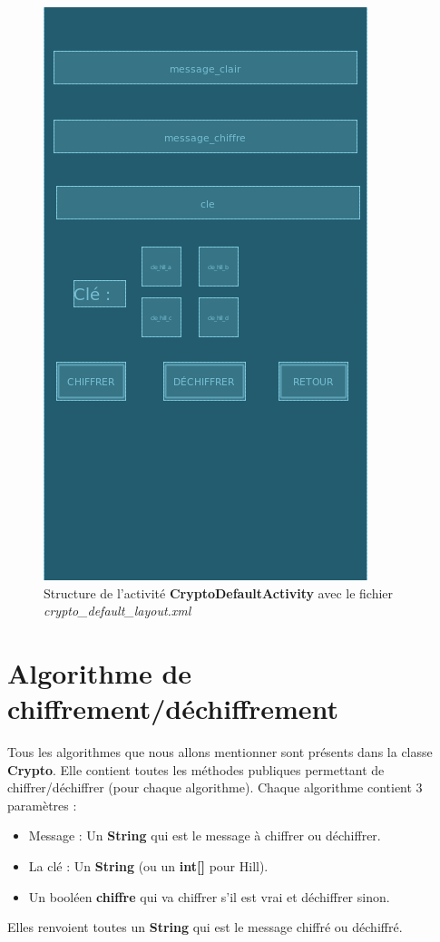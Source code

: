 \documentclass{article}
\begin{document}
\begin{figure}[h!]
\centering
\includegraphics[scale=0.4]{./img/layout.png}
\caption{Structure de l'activité \textbf{CryptoDefaultActivity} avec le fichier \textit{crypto\_default\_layout.xml} \label{fig:layout}}
\end{figure}

\section{Algorithme de chiffrement/déchiffrement}

Tous les algorithmes que nous allons mentionner sont présents dans la classe \textbf{Crypto}. Elle contient toutes les méthodes publiques permettant de chiffrer/déchiffrer (pour chaque algorithme).
Chaque algorithme contient 3 paramètres :
\begin{itemize}
\item Message : Un \textbf{String} qui est le message à chiffrer ou déchiffrer.
\item La clé : Un \textbf{String} (ou un \textbf{int[]} pour Hill).
\item Un booléen \textbf{chiffre} qui va chiffrer s'il est vrai et déchiffrer sinon.
\end{itemize}
Elles renvoient toutes un \textbf{String} qui est le message chiffré ou déchiffré.
\end{document}

